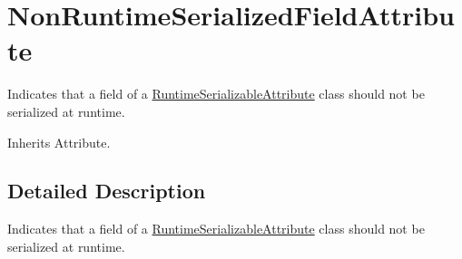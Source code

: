 \hypertarget{class_voxel_busters_1_1_runtime_serialization_1_1_non_runtime_serialized_field_attribute}{}\section{Non\+Runtime\+Serialized\+Field\+Attribute}
\label{class_voxel_busters_1_1_runtime_serialization_1_1_non_runtime_serialized_field_attribute}


Indicates that a field of a \hyperlink{class_voxel_busters_1_1_runtime_serialization_1_1_runtime_serializable_attribute}{Runtime\+Serializable\+Attribute} class should not be serialized at runtime.  




Inherits Attribute.



\subsection{Detailed Description}
Indicates that a field of a \hyperlink{class_voxel_busters_1_1_runtime_serialization_1_1_runtime_serializable_attribute}{Runtime\+Serializable\+Attribute} class should not be serialized at runtime. 

